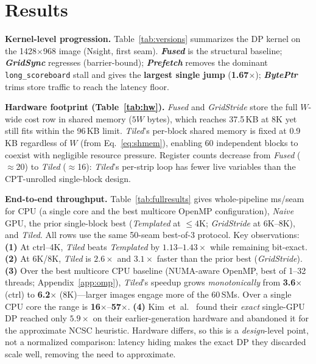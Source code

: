 \section{Results}
\label{sec:results}
\textbf{Kernel-level progression.} Table~\ref{tab:versions} summarizes the DP
kernel on the 1428$\times$968 image (Nsight, first seam).
\textbf{\emph{Fused}} is the structural baseline; \textbf{\emph{GridSync}}
regresses (barrier-bound); \textbf{\emph{Prefetch}} removes the dominant
\texttt{long\_scoreboard} stall and gives the \textbf{largest single jump}
(\textbf{1.67$\times$}); \textbf{\emph{BytePtr}} trims store traffic to reach
the latency floor.



\textbf{Hardware footprint (Table~\ref{tab:hw}).}
\emph{Fused} and \emph{GridStride} store the full $W$-wide cost row in
shared memory ($5W$ bytes), which reaches 37.5\,KB at 8K yet still fits
within the 96\,KB limit.
\emph{Tiled}'s per-block shared memory is fixed at 0.9\,KB regardless of
$W$ (from Eq.~\eqref{eq:shmem}), enabling 60 independent blocks to coexist
with negligible resource pressure.
Register counts decrease from \emph{Fused} (${\approx}$20) to \emph{Tiled}
(${\approx}$16): \emph{Tiled}'s per-strip loop has fewer live variables than
the CPT-unrolled single-block design.



\textbf{End-to-end throughput.} Table~\ref{tab:fullresults} gives
whole-pipeline ms/seam for CPU (a single core and the best multicore OpenMP
configuration), \emph{Naive} GPU, the prior single-block best (\emph{Templated} at ${\le}4$K;
\emph{GridStride} at 6K--8K), and \emph{Tiled}.
All rows use the same 50-seam best-of-3 protocol.
Key observations:
\textbf{(1)} At ctrl--4K, \emph{Tiled} beats \emph{Templated} by
\textbf{$1.13$--$1.43\times$} while remaining bit-exact.
\textbf{(2)} At 6K/8K, \emph{Tiled} is \textbf{$2.6\times$} and
\textbf{$3.1\times$} faster than the prior best (\emph{GridStride}).
\textbf{(3)} Over the best multicore CPU baseline (NUMA-aware OpenMP, best of
1--32 threads; Appendix~\ref{app:omp}), \emph{Tiled}'s speedup grows
\emph{monotonically} from \textbf{3.6$\times$} (ctrl) to \textbf{6.2$\times$}
(8K)---larger images engage more of the 60\,SMs. Over a single CPU core the
range is \textbf{16$\times$}--\textbf{57$\times$}.
\textbf{(4)} Kim~et~al.~\cite{kim2015} found their \emph{exact} single-GPU DP
reached only $5.9{\times}$ on their earlier-generation hardware and abandoned
it for the approximate NCSC heuristic. Hardware differs, so this is a
\emph{design}-level point, not a normalized comparison: latency hiding makes
the exact DP they discarded scale well, removing the need to approximate.

